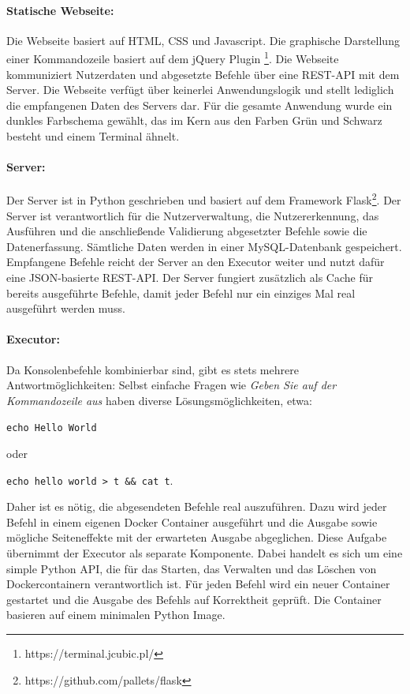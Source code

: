 \paragraph{Statische Webseite:}
Die Webseite basiert auf HTML, CSS und Javascript. Die graphische Darstellung einer Kommandozeile basiert auf dem jQuery Plugin \footnote{https://terminal.jcubic.pl/}. Die Webseite kommuniziert Nutzerdaten und abgesetzte Befehle über eine REST-API mit dem Server. Die Webseite verfügt über keinerlei Anwendungslogik und stellt lediglich die empfangenen Daten des Servers dar. Für die gesamte Anwendung wurde ein dunkles Farbschema gewählt, das im Kern aus den Farben Grün und Schwarz besteht und einem Terminal ähnelt.

\paragraph{Server:}
Der Server ist in Python geschrieben und basiert auf dem Framework Flask\footnote{https://github.com/pallets/flask}. Der Server ist verantwortlich für die Nutzerverwaltung, die Nutzererkennung, das Ausführen und die anschließende Validierung abgesetzter Befehle sowie die Datenerfassung. Sämtliche Daten werden in einer MySQL-Datenbank gespeichert. Empfangene Befehle reicht der Server an den Executor weiter und nutzt dafür eine JSON-basierte REST-API. Der Server fungiert zusätzlich als Cache für bereits ausgeführte Befehle, damit jeder Befehl nur ein einziges Mal real ausgeführt werden muss.

\paragraph{Executor:}

  Da Konsolenbefehle kombinierbar sind, gibt es stets mehrere Antwortmöglichkeiten: Selbst einfache Fragen wie \textit{Geben Sie  auf der Kommandozeile aus} haben diverse Lösungsmöglichkeiten, etwa:
  \begin{center}
      \verb|echo Hello World|
  \end{center}
  oder 
   \begin{center}
      \verb|echo hello world > t && cat t|.
  \end{center}
  Daher ist es nötig, die abgesendeten Befehle real auszuführen. Dazu wird jeder Befehl in einem eigenen Docker Container ausgeführt und die Ausgabe sowie mögliche Seiteneffekte mit der erwarteten Ausgabe abgeglichen. Diese Aufgabe übernimmt der Executor als separate Komponente. Dabei handelt es sich um eine simple Python API, die für das Starten, das Verwalten und das Löschen von Dockercontainern verantwortlich ist. Für jeden Befehl wird ein neuer Container gestartet und die Ausgabe des Befehls auf Korrektheit geprüft. Die Container basieren auf einem minimalen Python Image.


